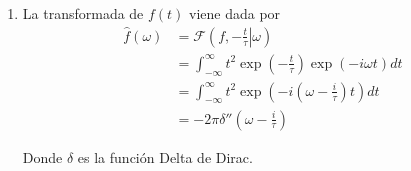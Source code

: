 \documentclass[a4paper,12pt,final]{article}
\begin{document}
\begin{enumerate}[label=\alph*)]


        \item La transformada de $f\left(t\right)$ viene dada por
          \begin{equation*}
            \begin{split}
              \widehat{f}\left(\omega\right) & = \mathcal{F}\left(f,\left.-\frac{t}{\tau}\right|\omega\right) \\
                                             & = \int_{-\infty}^{\infty}t^2\exp\left(-\frac{t}{\tau}\right)\exp\left(-i \omega t\right)dt \\
                                             & = \int_{-\infty}^{\infty}t^2\exp\left(-i \left(\omega - \frac{i}{\tau} \right) t\right)dt \\
                                             & = -2 \pi \delta''\left(\omega - \frac{i}{\tau} \right)
            \end{split}
          \end{equation*}

          \noindent Donde $\delta$ es la función Delta de Dirac.
      \end{enumerate}
\end{document}
